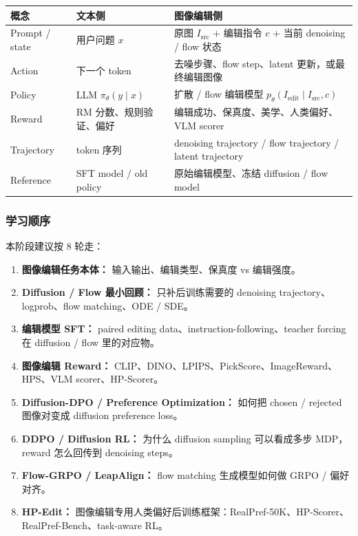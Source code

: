 \begin{center}
{\small
\begin{tabular}{p{3cm}p{4.7cm}p{5cm}}
\hline
\textbf{概念} & \textbf{文本侧} & \textbf{图像编辑侧} \\
\hline
Prompt / state
&
用户问题 $x$
&
原图 $I_\text{src}$ + 编辑指令 $c$ + 当前 denoising / flow 状态
\\
Action
&
下一个 token
&
去噪步骤、flow step、latent 更新，或最终编辑图像
\\
Policy
&
LLM $\pi_\theta(y\mid x)$
&
扩散 / flow 编辑模型 $p_\theta(I_\text{edit}\mid I_\text{src},c)$
\\
Reward
&
RM 分数、规则验证、偏好
&
编辑成功、保真度、美学、人类偏好、VLM scorer
\\
Trajectory
&
token 序列
&
denoising trajectory / flow trajectory / latent trajectory
\\
Reference
&
SFT model / old policy
&
原始编辑模型、冻结 diffusion / flow model
\\
\hline
\end{tabular}
}
\end{center}

\subsubsection{学习顺序}

本阶段建议按 8 轮走：

\begin{enumerate}[leftmargin=1.5em]
  \item \textbf{图像编辑任务本体：} 输入输出、编辑类型、保真度 vs 编辑强度。
  \item \textbf{Diffusion / Flow 最小回顾：} 只补后训练需要的 denoising trajectory、logprob、flow matching、ODE / SDE。
  \item \textbf{编辑模型 SFT：} paired editing data、instruction-following、teacher forcing 在 diffusion / flow 里的对应物。
  \item \textbf{图像编辑 Reward：} CLIP、DINO、LPIPS、PickScore、ImageReward、HPS、VLM scorer、HP-Scorer。
  \item \textbf{Diffusion-DPO / Preference Optimization：} 如何把 chosen / rejected 图像对变成 diffusion preference loss。
  \item \textbf{DDPO / Diffusion RL：} 为什么 diffusion sampling 可以看成多步 MDP，reward 怎么回传到 denoising steps。
  \item \textbf{Flow-GRPO / LeapAlign：} flow matching 生成模型如何做 GRPO / 偏好对齐。
  \item \textbf{HP-Edit：} 图像编辑专用人类偏好后训练框架：RealPref-50K、HP-Scorer、RealPref-Bench、task-aware RL。
\end{enumerate}

